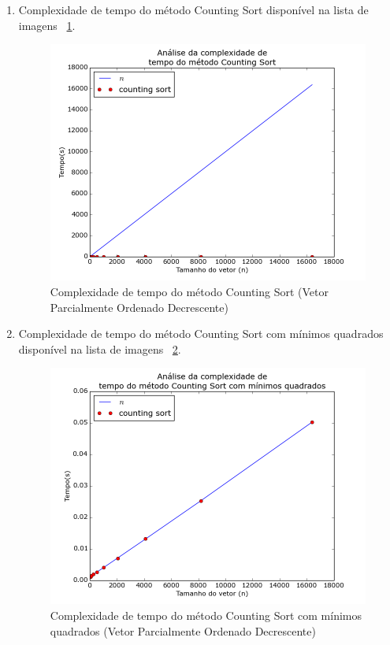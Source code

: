 \documentclass[12pt,a4paper,twoside]{report}
\begin{document}
\begin{enumerate}
										\begin{enumerate}
											\item Complexidade de tempo do método Counting Sort disponível na lista de imagens ~\ref{fig:CountingPlot2POD}.
											\begin{figure}[!h]
												\centering
												\includegraphics[scale=0.6]{../imagens/Counting/counting_plot_2_parcialmente_ordenado_decrescente.png}
												\caption{Complexidade de tempo do método Counting Sort (Vetor Parcialmente Ordenado Decrescente) \label{fig:CountingPlot2POD}}
											\end{figure}


											\item Complexidade de tempo do método Counting Sort com mínimos quadrados disponível na lista de imagens  ~\ref{fig:CountingPlot3POD}.
											\begin{figure}[!h]
												\centering
												\includegraphics[scale=0.6]{../imagens/Counting/counting_plot_3_parcialmente_ordenado_decrescente.png}
												\caption{Complexidade de tempo do método Counting Sort com mínimos quadrados (Vetor Parcialmente Ordenado Decrescente) \label{fig:CountingPlot3POD}}
											\end{figure}


\end{enumerate}
\end{enumerate}
\end{document}
